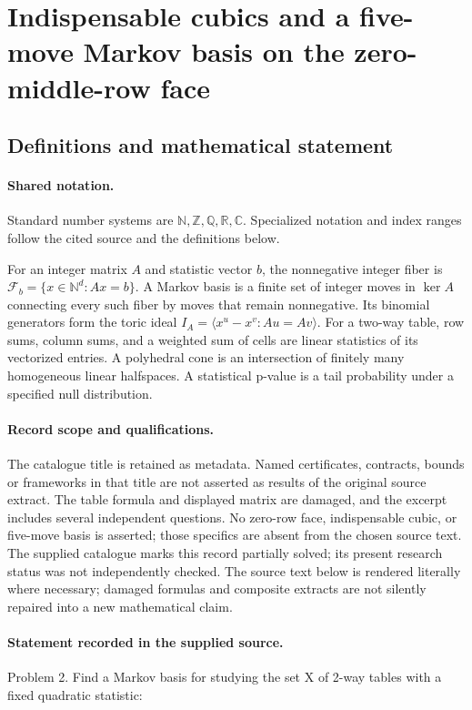 \documentclass[11pt]{article}
\begin{document}
\section{Indispensable cubics and a five-move Markov basis on the zero-middle-row face}\label{statement}

\subsection{Definitions and mathematical statement}

\paragraph{Shared notation.}Standard number systems are $\mathbb N,\mathbb Z,\mathbb Q,\mathbb R,\mathbb C$. Specialized notation and index ranges follow the cited source and the definitions below.


For an integer matrix $A$ and statistic vector $b$, the nonnegative integer fiber is $\mathcal F_b=\{x\in\mathbb N^d:Ax=b\}$. A Markov basis is a finite set of integer moves in $\ker A$ connecting every such fiber by moves that remain nonnegative. Its binomial generators form the toric ideal $I_A=\langle x^u-x^v:Au=Av\rangle$. For a two-way table, row sums, column sums, and a weighted sum of cells are linear statistics of its vectorized entries. A polyhedral cone is an intersection of finitely many homogeneous linear halfspaces. A statistical p-value is a tail probability under a specified null distribution.
\paragraph{Record scope and qualifications.}
The catalogue title is retained as metadata. Named certificates, contracts, bounds or frameworks in that title are not asserted as results of the original source extract.
The table formula and displayed matrix are damaged, and the excerpt includes several independent questions. No zero-row face, indispensable cubic, or five-move basis is asserted; those specifics are absent from the chosen source text. The supplied catalogue marks this record partially solved; its present research status was not independently checked.
The source text below is rendered literally where necessary; damaged formulas and composite extracts are not silently repaired into a new mathematical claim.
\paragraph{Statement recorded in the supplied source.}
Problem 2. Find a Markov basis for studying the set X of 2-way tables with a fixed quadratic statistic:
\end{document}
